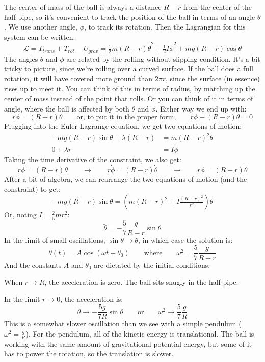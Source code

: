 \documentclass{article}
\newcommand{\purple}[1]{{\color{purple} #1}}
\begin{document}
\purple{
The center of mass of the ball is always a distance $R-r$ from the center of the half-pipe, so it's convenient to track the position of the ball in terms of an angle $\theta$. We use another angle, $\phi$, to track its rotation. Then the Lagrangian for this system can be written:
$$
\mathcal{L} = T_{trans} + T_{rot} - U_{grav} = \tfrac{1}{2} m (R-r) \dot{\theta}^2 + \tfrac{1}{2} I \dot{\phi}^2 + mg(R-r)\cos\theta
$$
The angles $\theta$ and $\phi$ are related by the rolling-without-slipping condition. It's a bit tricky to picture, since we're rolling over a curved surface. If the ball does a full rotation, it will have covered more ground than $2\pi r$, since the surface (in essence) rises up to meet it. You can think of this in terms of radius, by matching up the center of mass instead of the point that rolls. Or you can think of it in terms of angle, where the ball is affected by both $\theta$ and $\phi$. Either way we end up with:
$$
r \phi = (R-r) \theta
\quad\quad\text{or, to put it in the proper form,}\quad\quad
r\phi - (R-r) \theta = 0
$$
Plugging into the Euler-Lagrange equation, we get two equations of motion:
\begin{align*}
    -mg(R-r)\sin\theta - \lambda (R-r) &= m (R-r)^2 \ddot{\theta} \\ 
    0 + \lambda r &= I \ddot{\phi}
\end{align*}
Taking the time derivative of the constraint, we also get:
$$
r \phi = (R-r) \theta
\quad\quad\rightarrow\quad\quad
r \dot{\phi} = (R-r) \dot{\theta}
\quad\quad\rightarrow\quad\quad
r \ddot{\phi} = (R-r) \ddot{\theta}
$$
After a bit of algebra, we can rearrange the two equations of motion (and the constraint) to get:
$$
-mg (R-r)\sin\theta = \left( m (R-r)^2 + I \tfrac{(R-r)^2}{r^2} \right) \ddot{\theta}
$$
Or, noting $I = \tfrac{2}{5}mr^2$:
$$
\ddot{\theta} = -\frac{5}{7} \frac{ g }{R - r}\sin\theta
$$
In the limit of small oscillations, $\sin\theta \rightarrow \theta$, in which case the solution is:
$$
\theta(t) = A \cos \left( \omega t - \theta_0 \right)
\quad\quad\text{where}\quad\quad
\omega^2 = \frac{5}{7} \frac{g}{R-r}
$$
And the constants $A$ and $\theta_0$ are dictated by the initial conditions.

When $r \rightarrow R$, the acceleration is zero. The ball sits snugly in the half-pipe.

In the limit $r \rightarrow 0$, the acceleration is:
$$
\ddot{\theta} \rightarrow -\frac{5 g}{7 R} \sin\theta
\quad\quad\text{or}\quad\quad
\omega^2 \rightarrow \frac{5}{7} \frac{g}{R}
$$
This is a somewhat slower oscillation than we see with a simple pendulum ($\omega^2=\frac{g}{R}$). For the pendulum, all of the kinetic energy is translational. The ball is working with the same amount of gravitational potential energy, but some of it has to power the rotation, so the translation is slower. 

}
\end{document}
